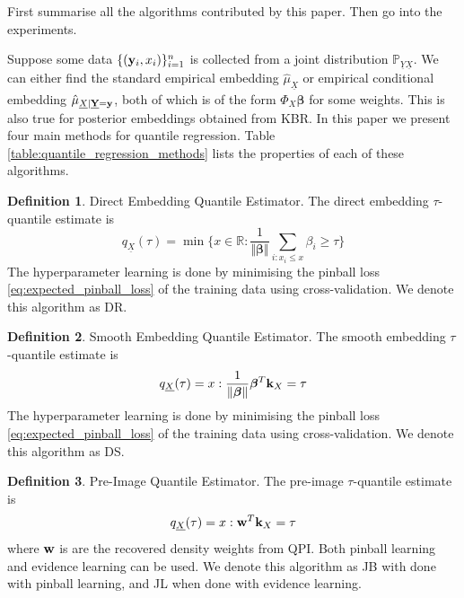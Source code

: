 \documentclass[twoside]{article} \usepackage{aistats2017}
\theoremstyle{definition}
\newtheorem{definition}{Definition}[section]
\theoremstyle{remark}
\newcommand{\rv}[1]{\underline{#1}}
\newcommand{\ds}[1]{{#1}}
\newcommand{\warn}[1]{{\color{RedOrange} #1}}
\begin{document}
	\warn{First summarise all the algorithms contributed by this paper. Then go into the experiments.}
	
	Suppose some data $\{(\mathbf{y}_{i}, x_{i})\}_{i = 1}^{n}$ is collected from a joint distribution $\mathbb{P}_{\rv{Y} \rv{X}}$. We can either find the standard empirical embedding $\hat{\mu}_{\rv{X}}$ or empirical conditional embedding $\hat{\mu}_{\rv{X} | \bvec{\rv{Y}} = \bvec{y}}$, both of which is of the form $\Phi_{\ds{X}} \bm{\beta}$ for some weights. This is also true for posterior embeddings obtained from KBR. In this paper we present four main methods for quantile regression. 	Table \ref{table:quantile_regression_methods} lists the properties of each of these algorithms.

	\theoremstyle{definition}
	\begin{definition}{Direct Embedding Quantile Estimator.}
		The direct embedding $\tau$-quantile estimate is
		\begin{equation}
			q_{\rv{X}}(\tau) = \min\{x \in \mathbb{R} : \frac{1}{\Vert \bm{\beta} \Vert} \sum_{i : x_{i} \leq x} \beta_{i} \geq \tau\}
		\end{equation}	
		The hyperparameter learning is done by minimising the pinball loss \eqref{eq:expected_pinball_loss} of the training data using cross-validation. We denote this algorithm as DR.
	\end{definition}
	
	\theoremstyle{definition}
	\begin{definition}{Smooth Embedding Quantile Estimator.}
		The smooth embedding $\tau$-quantile estimate is
		\begin{equation}
			q_{\rv{X}}(\tau) = x : \frac{1}{\Vert \bm{\beta} \Vert} \bm{\beta}^{T} \bvec{k}_{\ds{X}} = \tau
		\end{equation}	
		The hyperparameter learning is done by minimising the pinball loss \eqref{eq:expected_pinball_loss} of the training data using cross-validation. We denote this algorithm as DS.
	\end{definition}
	
	\theoremstyle{definition}
	\begin{definition}{Pre-Image Quantile Estimator.}
		The pre-image $\tau$-quantile estimate is
		\begin{equation}
			q_{\rv{X}}(\tau) = x : \bvec{w}^{T} \bvec{k}_{\ds{X}} = \tau
		\end{equation}	
		where $\mathbf{w}$ is are the recovered density weights from QPI.
		Both pinball learning and evidence learning can be used. We denote this algorithm as JB with done with pinball learning, and JL when done with evidence learning.
	\end{definition}
	
\end{document}
